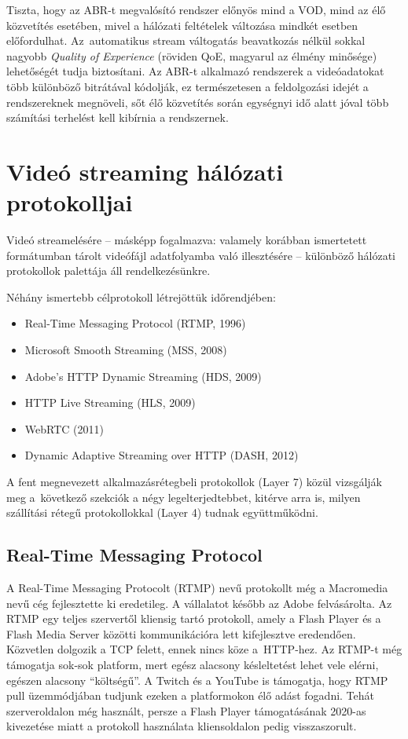 Tiszta, hogy az ABR-t megvalósító rendszer előnyös mind a VOD, mind az élő közvetítés esetében, mivel a hálózati feltételek változása mindkét esetben előfordulhat. Az~automatikus stream váltogatás beavatkozás nélkül sokkal nagyobb \emph{Quality of Experience} (röviden QoE, magyarul az élmény minősége) lehetőségét tudja biztosítani\cite{DashAbr}. Az ABR-t alkalmazó rendszerek a videóadatokat több különböző bitrátával kódolják, ez természetesen a feldolgozási idejét a rendszereknek megnöveli, sőt élő közvetítés során egységnyi idő alatt jóval több számítási terhelést kell kibírnia a rendszernek.

\section{Videó streaming hálózati protokolljai}

Videó streamelésére -- másképp fogalmazva: valamely korábban ismertetett formátumban tárolt videófájl adatfolyamba való illesztésére -- különböző hálózati protokollok palettája áll rendelkezésünkre.

Néhány ismertebb célprotokoll létrejöttük időrendjében\cite{StreamingHistory}:

\begin{itemize}
	\setlength{\itemsep}{1pt}
  \setlength{\parskip}{0pt}
  \setlength{\parsep}{0pt}
	\item Real-Time Messaging Protocol (RTMP, 1996)
	\item Microsoft Smooth Streaming (MSS, 2008)
	\item Adobe's HTTP Dynamic Streaming (HDS, 2009)
	\item HTTP Live Streaming (HLS, 2009)
	\item WebRTC (2011)
	\item Dynamic Adaptive Streaming over HTTP (DASH, 2012)
\end{itemize}

A fent megnevezett alkalmazásrétegbeli protokollok (Layer 7) közül vizsgálják meg a~következő szekciók a négy legelterjedtebbet, kitérve arra is, milyen szállítási rétegű protokollokkal (Layer 4) tudnak együttműködni.

\subsection{Real-Time Messaging Protocol}

A Real-Time Messaging Protocolt (RTMP) nevű protokollt még a Macromedia nevű cég fejlesztette ki eredetileg. A vállalatot később az Adobe felvásárolta. Az RTMP egy teljes szervertől kliensig tartó protokoll, amely a Flash Player és a Flash Media Server közötti kommunikációra lett kifejlesztve eredendően. Közvetlen dolgozik a TCP felett, ennek nincs köze a~HTTP-hez.\cite{StreamingHistory} Az RTMP-t még támogatja sok-sok platform, mert egész alacsony késleltetést lehet vele elérni, egészen alacsony ``költségű''. A Twitch és a YouTube is támogatja, hogy RTMP pull üzemmódjában tudjunk ezeken a platformokon élő adást fogadni. Tehát szerveroldalon még használt, persze a Flash Player támogatásának 2020-as kivezetése miatt a protokoll használata kliensoldalon pedig visszaszorult.

